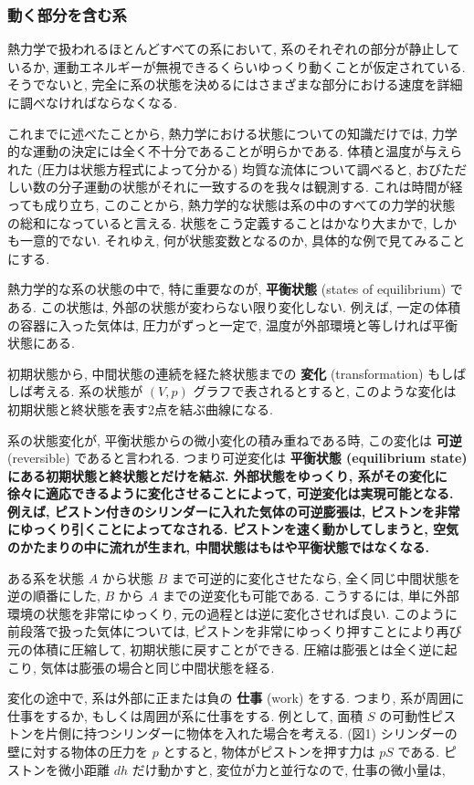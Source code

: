 \subsubsection*{動く部分を含む系}
熱力学で扱われるほとんどすべての系において, 系のそれぞれの部分が静止しているか, 運動エネルギーが無視できるくらいゆっくり動くことが仮定されている. そうでないと, 完全に系の状態を決めるにはさまざまな部分における速度を詳細に調べなければならなくなる. \par
これまでに述べたことから, 熱力学における状態についての知識だけでは, 力学的な運動の決定には全く不十分であることが明らかである. 体積と温度が与えられた (圧力は状態方程式によって分かる) 均質な流体について調べると, おびただしい数の分子運動の状態がそれに一致するのを我々は観測する. これは時間が経っても成り立ち, このことから, 熱力学的な状態は系の中のすべての力学的状態の総和になっていると言える. 状態をこう定義することはかなり大まかで, しかも一意的でない. それゆえ, 何が状態変数となるのか, 具体的な例で見てみることにする. \par
熱力学的な系の状態の中で, 特に重要なのが, \textbf{平衡状態} (states of equilibrium) である. この状態は, 外部の状態が変わらない限り変化しない. 例えば, 一定の体積の容器に入った気体は, 圧力がずっと一定で, 温度が外部環境と等しければ平衡状態にある. \par
初期状態から, 中間状態の連続を経た終状態までの \textbf{変化} (transformation) もしばしば考える. 系の状態が $(V,p)$ グラフで表されるとすると, このような変化は初期状態と終状態を表す2点を結ぶ曲線になる.\par
系の状態変化が, 平衡状態からの微小変化の積み重ねである時, この変化は \textbf{可逆} (reversible) であると言われる. つまり可逆変化は \bf{平衡状態} (equilibrium state) にある初期状態と終状態とだけを結ぶ. 外部状態をゆっくり, 系がその変化に徐々に適応できるように変化させることによって, 可逆変化は実現可能となる. 例えば, ピストン付きのシリンダーに入れた気体の可逆膨張は, ピストンを非常にゆっくり引くことによってなされる. ピストンを速く動かしてしまうと, 空気のかたまりの中に流れが生まれ, 中間状態はもはや平衡状態ではなくなる.\par
ある系を状態 $A$ から状態 $B$ まで可逆的に変化させたなら, 全く同じ中間状態を逆の順番にした, $B$ から $A$ までの逆変化も可能である. こうするには, 単に外部環境の状態を非常にゆっくり, 元の過程とは逆に変化させれば良い. このように前段落で扱った気体については, ピストンを非常にゆっくり押すことにより再び元の体積に圧縮して, 初期状態に戻すことができる. 圧縮は膨張とは全く逆に起こり, 気体は膨張の場合と同じ中間状態を経る. \par
変化の途中で, 系は外部に正または負の \textbf{仕事} (work) をする. つまり, 系が周囲に仕事をするか, もしくは周囲が系に仕事をする. 例として, 面積 $S$ の可動性ピストンを片側に持つシリンダーに物体を入れた場合を考える. (図1) シリンダーの壁に対する物体の圧力を $p$ とすると, 物体がピストンを押す力は $pS$ である. ピストンを微小距離 $dh$ だけ動かすと, 変位が力と並行なので, 仕事の微小量は, 

